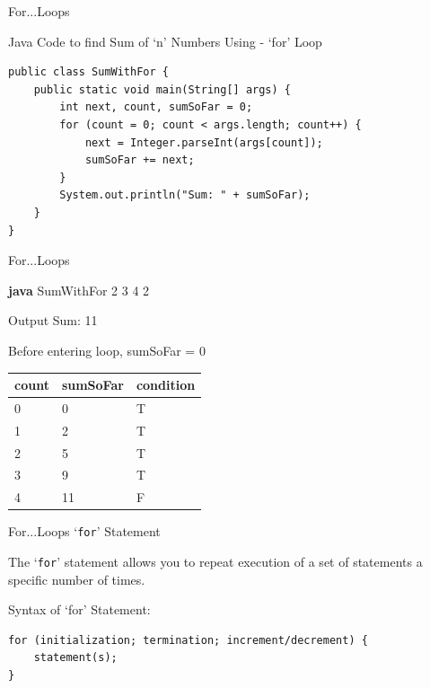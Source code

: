 \documentclass[14pt]{beamer}
\begin{document}
\begin{frame}[fragile]{For...Loops}
\begin{block}{Java Code  to find Sum of `n' Numbers Using - `for' Loop }
\begin{lstlisting}[numbers=none]
public class SumWithFor {
    public static void main(String[] args) {
        int next, count, sumSoFar = 0;
        for (count = 0; count < args.length; count++) {
            next = Integer.parseInt(args[count]);
            sumSoFar += next;
        }
        System.out.println("Sum: " + sumSoFar);
    }
}
\end{lstlisting}
\end{block}
\end{frame}


\begin{frame}{For...Loops}
\begin{minipage}{10cm}
\textbf{java} SumWithFor 2 3 4 2 
\begin{block}{Output}
Sum: 11
\end{block}
\end{minipage}

\vspace{1pc}
\begin{minipage}{4cm}
\tiny
Before entering loop, sumSoFar = 0
\begin{tabular}{| p{1.2cm} | p{2cm} | p{2cm} |}
\hline
\textbf{count} & \textbf{sumSoFar} & \textbf{condition} \\ \hline
0 & 0 & T \\ \hline
1 & 2 & T \\ \hline
2 & 5 & T \\ \hline
3 & 9 & T \\ \hline
4 & 11 & F \\ \hline
\end{tabular}
\end{minipage}
\end{frame}

\begin{frame}[fragile]{For...Loops}
`\lstinline!for!' Statement

\vspace{1pc}
The `\lstinline!for!' statement allows you to repeat execution of a set of statements a specific number of times.
\begin{block}{Syntax of  `for'  Statement:}
\begin{lstlisting}[numbers=none]
for (initialization; termination; increment/decrement) { 
    statement(s);
}  
\end{lstlisting}
\end{block}
\end{frame}
\end{document}
